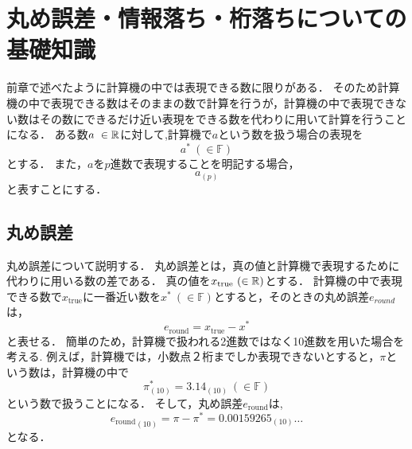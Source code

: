 \chapter{丸め誤差・情報落ち・桁落ちについての基礎知識}
前章で述べたように計算機の中では表現できる数に限りがある．
そのため計算機の中で表現できる数はそのままの数で計算を行うが，計算機の中で表現できない数はその数にできるだけ近い表現をできる数を代わりに用いて計算を行うことになる．
ある数$a\ \in \mathbb{R}$に対して,計算機で$a$という数を扱う場合の表現を
\begin{equation*}    
    a^{\ast} \ (\in \mathbb{F})
\end{equation*}
とする．
また，$a$を$p$進数で表現することを明記する場合，
\begin{equation*}
    a_{(p)}
\end{equation*}
と表すことにする．
\label{chap:基礎知識2}
\section{丸め誤差}
丸め誤差について説明する．
丸め誤差とは，真の値と計算機で表現するために代わりに用いる数の差である．
真の値を$x_{\mathrm{true}} \ (\in \mathbb{R})$とする．
計算機の中で表現できる数で$x_{\mathrm{true}}$に一番近い数を$x^{\ast} \ (\in \mathbb{F})$とすると，そのときの丸め誤差$e_{round}$は，
\begin{equation*}
    e_{\mathrm{round}} = x_{\mathrm{true}} - x^{\ast}
\end{equation*}
と表せる．
簡単のため，計算機で扱われる2進数ではなく10進数を用いた場合を考える.
例えば，計算機では，小数点２桁までしか表現できないとすると，$\pi$という数は，計算機の中で
\begin{equation*}
    \pi^{\ast}_{(10)} = 3.14_{(10)} \ (\in \mathbb{F})
\end{equation*}
という数で扱うことになる．
そして，丸め誤差$e_{\mathrm{round}}$は,
\begin{equation*}
    {e_{\mathrm{round}}}_{(10)} = \pi - \pi^{\ast} = {0.00159265_{(10)}\dots}
\end{equation*}
となる．


